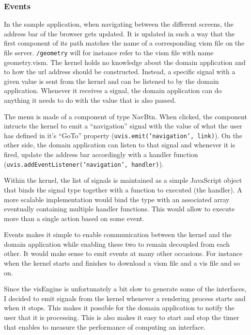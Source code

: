 \subsubsection{Events}

In the sample application, when navigating between the different screens, the address bar of the browser gets updated. It is updated in such a way that the first component of its path matches the name of a corresponding vism file on the file server. \texttt{/geometry} will for instance refer to the vism file with name geometry.vism. The kernel holds no knowledge about the domain application and to how the url address should be constructed. Instead, a specific signal with a given value is sent from the kernel and can be listened to by the domain application. Whenever it receives a signal, the domain application can do anything it needs to do with the value that is also passed.

The menu is made of a component of type NavBtn. When clicked, the component intructs the kernel to emit a ``navigation'' signal with the value of what the user has defined in it's ``GoTo'' property (\texttt{uvis.emit('navigation', link)}). On the other side, the domain application can listen to that signal and whenever it is fired, update the address bar accordingly with a handler function  (\texttt{uvis.addEventListener('navigation', handler)}).

Within the kernel, the list of signals is maintained as a simple JavaScript object that binds the signal type together with a function to executed (the handler). A more scalable implementation would bind the type with an associated array eventually containing multiple handler functions. This would allow to execute more than a single action based on some event.

Events makes it simple to enable communication between the kernel and the domain application while enabling these two to remain decoupled from each other. It would make sense to emit events at many other occasions. For instance when the kernel starts and finishes to download a vism file and a vis file and so on.

Since the visEngine is unfortunately a bit slow to generate some of the interfaces, I decided to emit signals from the kernel whenever a rendering process starts and when it stops. This makes it possible for the domain application to notify the user that it is processing. This is also makes it easy to start and stop the timer that enables to measure the performance of computing an interface.

